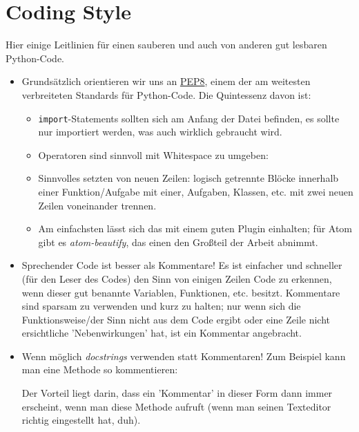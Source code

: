 \def\code#1{\texttt{#1}}
\lstset{language=Python}  

\section{Coding Style}
\label{sec:cs}

Hier einige Leitlinien für einen sauberen und auch von anderen gut lesbaren Python-Code.

\begin{itemize}
	\item Grundsätzlich orientieren wir uns an \href{http://legacy.python.org/dev/peps/pep-0008/#introduction}{PEP8}, einem der am weitesten verbreiteten Standards für Python-Code. Die Quintessenz davon ist:
	\begin{itemize}
		\item \code{import}-Statements sollten sich am Anfang der Datei befinden, es sollte nur importiert werden, was auch wirklich gebraucht wird.

		\item Operatoren sind sinnvoll mit Whitespace zu umgeben:
		

		\item Sinnvolles setzten von neuen Zeilen: logisch getrennte Blöcke innerhalb einer Funktion/Aufgabe mit einer, Aufgaben, Klassen, etc. mit zwei neuen Zeilen voneinander trennen.

		\item Am einfachsten lässt sich das mit einem guten Plugin einhalten; für Atom gibt es \emph{atom-beautify}, das einen den Großteil der Arbeit abnimmt.
	\end{itemize}

	\item Sprechender Code ist besser als Kommentare! Es ist einfacher und schneller (für den Leser des Codes) den Sinn von einigen Zeilen Code zu erkennen, wenn dieser gut benannte Variablen, Funktionen, etc. besitzt. Kommentare sind sparsam zu verwenden und kurz zu halten; nur wenn sich die Funktionsweise/der Sinn nicht aus dem Code ergibt oder eine Zeile nicht ersichtliche 'Nebenwirkungen' hat, ist ein Kommentar angebracht.

	\item Wenn möglich \emph{docstrings} verwenden statt Kommentaren! Zum Beispiel kann man eine Methode so kommentieren:
	
	Der Vorteil liegt darin, dass ein 'Kommentar' in dieser Form dann immer erscheint, wenn man diese Methode aufruft (wenn man seinen Texteditor richtig eingestellt hat, duh).


\end{itemize}
